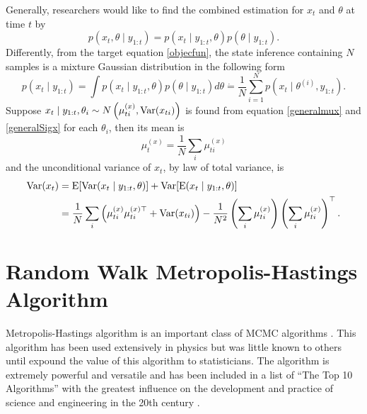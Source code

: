 Generally, researchers would like to find the combined estimation for $x_t$ and $\theta$ at time $t$ by
\begin{equation}
p(x_t, \theta \mid y_{1:t}) = p(x_t\mid y_{1:t},\theta)p(\theta\mid y_{1:t}).
\end{equation}
Differently, from the target equation \eqref{objecfun}, the state inference containing $N$ samples is a mixture Gaussian distribution in the following form 
\begin{equation}\label{mixtureGaussian}
p(x_t \mid y_{1:t}) = \int p(x_t\mid y_{1:t},\theta) p(\theta\mid y_{1:t})d\theta \dot{=} \frac{1}{N}\sum_{i=1}^{N}p\left(x_{t}\mid\theta^{(i)},y_{1:t}\right). 
\end{equation}
Suppose $x_t\mid y_{1:t},\theta_i \sim N\left( \mu_{ti}^{(x)},\mathrm{Var}(x_{ti}) \right)$ is found from equation \eqref{generalmux} and \eqref{generalSigx} for each $\theta_i$, then its mean is 
\begin{equation}\label{mixturemean}
\mu_t^{(x)} = \frac{1}{N} \sum_i \mu_{ti}^{(x)} 
\end{equation}
and  the unconditional variance of $x_t$, by law of total variance, is 
\begin{equation}\label{mixturevariance}
\begin{split}
\mathrm{Var}(x_t) &= \mathrm{E}\lbrack \mathrm{Var}(x_t\mid y_{1:t},\theta)\rbrack + \mathrm{Var}\lbrack \mathrm{E}(x_t\mid y_{1:t},\theta)\rbrack \\
&= \frac{1}{N} \sum_i \left( \mu_{ti}^{(x)}  \mu_{ti}^{(x)\top} +\mathrm{Var}(x_{ti})\right) -\frac{1}{N^2} \left(  \sum_i  \mu_{ti}^{(x)} \right) \left( \sum_i \mu_{ti}^{(x)} \right) ^\top.
\end{split}
\end{equation}

\section{Random Walk Metropolis-Hastings Algorithm}

Metropolis-Hastings algorithm is an important class of MCMC algorithms \citep{smith1993bayesian, tierney1994markov, gilks1995markov}.  This algorithm has been used extensively in physics but was little known to others until  \cite{muller1991generic, tierney1994markov} expound the value of this algorithm to statisticians. The algorithm is extremely powerful and versatile and has been included in a list of ``The Top 10 Algorithms''  with the greatest influence on the development and practice of science and engineering in the 20th century \citep{dongarra2000guest, medova2008bayesian}. 

